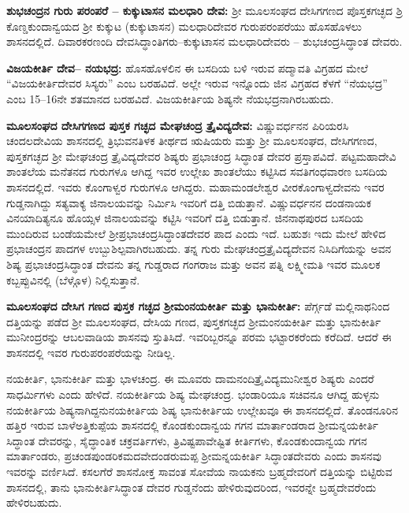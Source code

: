 \textbf{ಶುಭಚಂದ್ರನ ಗುರು ಪರಂಪರೆ – ಕುಕ್ಕುಟಾಸನ ಮಲಧಾರಿ ದೇವ:} ಶ‍್ರೀ ಮೂಲಸಂಘದ ದೇಸಿಗಗಣದ ಪೊಸ್ತಕಗಚ್ಛದ ಶ್ರಿ ಕೊಣ್ಡಕುಂದಾನ್ವಯದ ಶ‍್ರೀ ಕುಕ್ಕುಟ (ಕುಕ್ಕುಟಾಸನ) ಮಲಧಾರಿದೇವರ ಗುರುಪರಂಪರೆಯು ಹೊಸಹೊಳಲು ಶಾಸನದಲ್ಲಿದೆ. ದಿವಾರಕರಣಂದಿ ದೇವಸಿದ್ಧಾಂತಿಗರು–ಕುಕ್ಕುಟಾಸನ ಮಲಧಾರಿದೇವರು – ಶುಭಚಂದ್ರಸಿದ್ಧಾಂತ ದೇವರು.

\textbf{ವಿಜಯಕೀರ್ತಿ ದೇವ– ನಯಭದ್ರ:} ಹೊಸಹೊಳಲಿನ ಈ ಬಸದಿಯ ಬಳಿ ಇರುವ ಪದ್ಮಾವತಿ ವಿಗ್ರಹದ ಮೇಲೆ “ವಿಜಯಕೀರ್ತಿದೇವರ ಸಿಸ್ಯರು” ಎಂಬ ಬರಹವಿದೆ. ಅಲ್ಲೇ ಇರುವ ಇನ್ನೊಂದು ಜಿನ ವಿಗ್ರಹದ ಕೆಳಗೆ “ನೆಯಭದ್ರ” ಎಂಬ 15–16ನೇ ಶತಮಾನದ ಬರಹವಿದೆ. ವಿಜಯಕೀರ್ತಿಯ ಶಿಷ್ಯನೇ ನೆಯಭದ್ರನಾಗಿರಬಹುದು.

\textbf{ಮೂಲಸಂಘದ ದೇಸಿಗಗಣದ ಪುಸ್ತಕ ಗಚ್ಛದ ಮೇಘಚಂದ್ರ ತ್ರೈವಿದ್ಯದೇವ:} ವಿಷ್ಣುವರ್ಧನನ ಪಿರಿಯರಸಿ ಚಂದಲದೇವಿಯ ಶಾಸನದಲ್ಲಿ ತ್ರಿಭುವನತಿಳಕ ತೀರ್ಥದ ಋಷಿಯರು ಮತ್ತು ಶ‍್ರೀ ಮೂಲಸಂಘದ, ದೇಸಿಗಗಣದ, ಪುಸ್ತಕಗಚ್ಛದ ಶ‍್ರೀ ಮೇಘಚಂದ್ರ ತ್ರೈವಿದ್ಯದೇವರ ಶಿಷ್ಯರು ಪ್ರಭಾಚಂದ್ರ ಸಿದ್ಧಾಂತ ದೇವರ ಪ್ರಸ್ತಾಪವಿದೆ. ಪಟ್ಟಮಹಾದೇವಿ ಶಾಂತಲೆಯ ಮನೆತನದ ಗುರುಗಳೂ ಆಗಿದ್ದ ಇವರ ಉಲ್ಲೇಖ ಶಾಂತಲೆಯು ಕಟ್ಟಿಸಿದ ಸವತಿಗಂಧವಾರಣ ಬಸದಿಯ ಶಾಸನದಲ್ಲಿದೆ. ಇವರು ಕೊಂಗಾಳ್ವರ ಗುರುಗಳೂ ಆಗಿದ್ದರು. ಮಹಾಮಂಡಲೇಶ್ವರ ವೀರಕೊಂಗಾಳ್ವದೇವನು ಇವರ ಗುಡ್ಡನಾಗಿದ್ದು ಸತ್ಯವಾಕ್ಯ ಜಿನಾಲಯವನ್ನು ನಿರ್ಮಿಸಿ ಇವರಿಗೆ ದತ್ತಿ ಬಿಡುತ್ತಾನೆ. ವಿಷ್ಣುವರ್ಧನನ ದಂಡನಾಯಕ ವಿನಯಾದಿತ್ಯನೂ ಹೊಯ್ಸಳ ಜಿನಾಲಯವನ್ನು ಕಟ್ಟಿಸಿ ಇವರಿಗೆ ದತ್ತಿ ಬಿಡುತ್ತಾನೆ. ಜಿನನಾಥಪುರದ ಬಸದಿಯ ಮುಂದಿರುವ ಬಂಡೆಯಮೇಲೆ ಶ‍್ರೀಪ್ರಭಾಚಂದ್ರಸಿದ್ಧಾಂತದೇವರ ಪಾದ ಎಂದು ಇದೆ. ಬಹುಶಃ ಇದು ಮೇಲೆ ಹೇಳಿದ ಪ್ರಭಾಚಂದ್ರನ ಪಾದಗಳ ಉಬ್ಬುಶಿಲ್ಪವಾಗಿರಬಹುದು. ತನ್ನ ಗುರು ಮೇಘಚಂದ್ರತ್ರೈವಿದ್ಯದೇವನ ನಿಸಿದಿಗೆಯನ್ನು ಅವನ ಶಿಷ್ಯ ಪ್ರಭಾಚಂದ್ರಸಿದ್ಧಾಂತ ದೇವನು ತನ್ನ ಗುಡ್ಡರಾದ ಗಂಗರಾಜ ಮತ್ತು ಅವನ ಪತ್ನಿ ಲಕ್ಷ್ಮೀಮತಿ ಇವರ ಮೂಲಕ ಕಬ್ಬಪ್ಪುವಿನಲ್ಲಿ (ಬೆಳ್ಗೊಳ) ನಿಲ್ಲಿಸುತ್ತಾನೆ.

\textbf{ಮೂಲಸಂಘದ ದೇಸಿಗ ಗಣದ ಪುಸ್ತಕ ಗಚ್ಛದ ಶ‍್ರೀಮಂನಯಕೀರ್ತಿ ಮತ್ತು ಭಾನುಕೀರ್ತಿ:} ಪೆರ್ಗ್ಗಡೆ ಮಲ್ಲಿನಾಥನಿಂದ ದತ್ತಿಯನ್ನು ಪಡೆದ ಶ‍್ರೀ ಮೂಲಸಂಘದ, ದೇಸಿಯ ಗಣದ, ಪುಸ್ತಕಗಚ್ಛದ ಶ‍್ರೀಮಂನಯಕೀರ್ತಿ ಮತ್ತು ಭಾನುಕೀರ್ತಿ ಮುನೀಂದ್ರರನ್ನು ಆಬಲವಾಡಿಯ ಶಾಸನವು ಸ್ತುತಿಸಿದೆ. ಇವರಿಬ್ಬರನ್ನೂ ಪರಮ ಭಟ್ಟಾರಕರೆಂದು ಕರೆದಿದೆ. ಆದರೆ ಈ ಶಾಸನದಲ್ಲಿ ಇವರ ಗುರುಪರಂಪರೆಯನ್ನು ನೀಡಿಲ್ಲ. 

ನಯಕೀರ್ತಿ, ಭಾನುಕೀರ್ತಿ ಮತ್ತು ಭಾಳಚಂದ್ರ. ಈ ಮೂವರು ದಾಮನಂದಿತ್ರೈವಿದ್ಯಮುನೀಶ್ವರ ಶಿಷ್ಯರು ಎಂದರೆ ಸಾಧರ್ಮಿಗಳು ಎಂದು ಹೇಳಿದೆ. ನಯಕೀರ್ತಿಯ ಶಿಷ್ಯ ಮೇಘಚಂದ್ರ. ಭಂಡಾರಿಯೂ ಸಚಿವನೂ ಆಗಿದ್ದ ಹುಳ್ಳನು ನಯಕೀರ್ತಿಯ ಶಿಷ್ಯನಾಗಿದ್ದನುನಯಕೀರ್ತಿಯ ಶಿಷ್ಯ ಭಾನುಕೀರ್ತಿಯ ಉಲ್ಲೇಖವೂ ಈ ಶಾಸನದಲ್ಲಿದೆ. ತೊಂಡನೂರಿನ ಹತ್ತಿರ ಇರುವ ಬಾಳೆಅತ್ತಿಕುಪ್ಪೆಯ ಶಾಸನದಲ್ಲಿ ಕೊಂಡಕುಂದಾನ್ವಯ ಗಗನ ಮಾರ್ತಾಂಡರಾದ ಶ‍್ರೀಮನ್ನಯಕೀರ್ತಿ ಸಿದ್ಧಾಂತ ದೇವರನ್ನು, ಸೈದ್ಧಾಂತಿಕ ಚಕ್ರವರ್ತಿಗಳು, ತ್ರಿವಿಷ್ಟಪಾವೇಷ್ಟಿತ ಕೀರ್ತಿಗಳು, ಕೊಂಡಕುಂದಾನ್ವಯ ಗಗನ ಮಾರ್ತಾಂಡರು, ಪ್ರಚಂಡಪುಂಡರಿಕಮದವೇದಂಡರುಮಪ್ಪ ಶ‍್ರೀಮನ್ನಯಕೀರ್ತಿ ಸಿದ್ಧಾಂತದೇವರು ಎಂದು ಶಾಸನವು ಇವರನ್ನು ವರ್ಣಿಸಿದೆ. ಕಸಲಗೆರೆ ಶಾಸನೋಕ್ತ ಸಾವಂತ ಸೋವೆಯ ನಾಯಕನು ಬ್ರಹ್ಮದೇವರಿಗೆ ದತ್ತಿಯನ್ನು ಬಿಟ್ಟಿರುವ ಶಾಸನದಲ್ಲಿ, ತಾನು ಭಾನುಕೀರ್ತಿಸಿದ್ಧಾಂತ ದೇವರ ಗುಡ್ಡನೆಂದು ಹೇಳಿರುವುದರಿಂದ, ಇವರನ್ನೇ ಬ್ರಹ್ಮದೇವರೆಂದು ಹೇಳಿರಬಹುದು.

